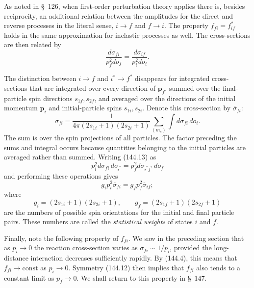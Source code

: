 As noted in \S~126, when first-order perturbation theory applies there is, besides reciprocity, an additional relation between the amplitudes for the direct and reverse processes in the literal sense, $i\to f$ and $f\to i$. The property $f_{fi}=f_{if}^*$ holds in the same approximation for inelastic processes as well. The cross-sections are then related by
\begin{equation}
 \frac{d\sigma_{fi}}{p_f^2d\mathit{o}_f}
 =\frac{d\sigma_{if}}{p_i^2d\mathit{o}_i}.
 \tag{144.14}
\end{equation}

The distinction between $i\to f$ and $i^*\to f^*$ disappears for integrated cross-sections that are integrated over every direction of $\mathbf p_f$, summed over the final-particle spin directions $s_{1f},s_{2f}$, and averaged over the directions of the initial momentum $\mathbf p_i$ and initial-particle spins $s_{1i},s_{2i}$. Denote this cross-section by $\overline\sigma_{fi}$:
\[
 \overline\sigma_{fi}=\frac1{4\pi(2s_{1i}+1)(2s_{2i}+1)}
 \sum_{(m_s)}\int d\sigma_{fi}\,d\mathit{o}_i.
\]
The sum is over the spin projections of all particles. The factor preceding the sums and integral occurs because quantities belonging to the initial particles are averaged rather than summed. Writing (144.13) as
\[
 p_i^2d\sigma_{fi}\,d\mathit{o}_{i^*}
 =p_f^2d\sigma_{i^*f^*}\,d\mathit{o}_f
\]
and performing these operations gives
\begin{equation}
 g_ip_i^2\overline\sigma_{fi}=g_fp_f^2\overline\sigma_{if};
 \tag{144.15}
\end{equation}
where
\begin{equation}
 g_i=(2s_{1i}+1)(2s_{2i}+1),\qquad
 g_f=(2s_{1f}+1)(2s_{2f}+1)
 \tag{144.16}
\end{equation}
are the numbers of possible spin orientations for the initial and final particle pairs. These numbers are called the \emph{statistical weights} of states $i$ and $f$.

Finally, note the following property of $f_{fi}$. We saw in the preceding section that as $p_i\to0$ the reaction cross-section varies as $\sigma_{fi}\sim1/p_i$, provided the long-distance interaction decreases sufficiently rapidly. By (144.4), this means that $f_{fi}\to\mathrm{const}$ as $p_i\to0$. Symmetry (144.12) then implies that $f_{fi}$ also tends to a constant limit as $p_f\to0$. We shall return to this property in \S~147.

